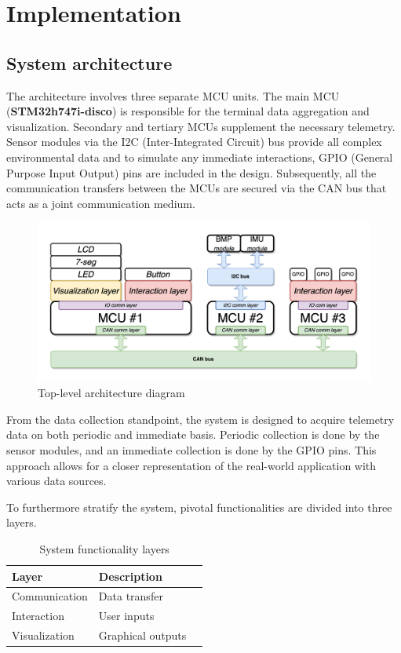 \chapter{Implementation}\label{ch:solution}

\section{System architecture}\label{sec:system-architecture}

The architecture involves three separate MCU units.
The main MCU (\textbf{STM32h747i-disco}) is responsible for the terminal data aggregation and visualization.
Secondary and tertiary MCUs supplement the necessary telemetry.
Sensor modules via the I2C (Inter-Integrated Circuit) bus provide all complex environmental data and to
simulate any immediate interactions, GPIO (General Purpose Input Output) pins are included in the design.
Subsequently, all the communication transfers between the MCUs are secured via the CAN bus that acts as a joint
communication medium.

\begin{figure}[h]
    \centering
    \includegraphics[width=1.0\textwidth]{images/top-level.drawio}
    \caption{Top-level architecture diagram}\label{fig:figure-top-level}
\end{figure}

From the data collection standpoint, the system is designed to acquire telemetry data on both periodic and immediate
basis.
Periodic collection is done by the sensor modules, and an immediate collection is done by the GPIO pins.
This approach allows for a closer representation of the real-world application with various data sources.

\newpage

To furthermore stratify the system, pivotal functionalities are divided into three layers.
\begin{table}[ht]
    \centering
    \begin{tabular}{lll}
        \toprule
        \textbf{Layer} & \textbf{Description} \\
        \midrule
        Communication & Data transfer \\
        \midrule
        Interaction & User inputs \\
        \midrule
        Visualization & Graphical outputs \\
        \bottomrule
    \end{tabular}
    \caption{System functionality layers}
    \label{tab:architecture_layers}
\end{table}

